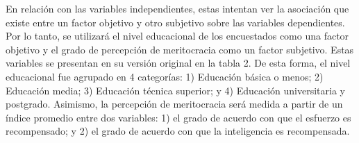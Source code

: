 \documentclass[
]{article}
\begin{document}
En relación con las variables independientes, estas intentan ver la
asociación que existe entre un factor objetivo y otro subjetivo sobre
las variables dependientes. Por lo tanto, se utilizará el nivel
educacional de los encuestados como una factor objetivo y el grado de
percepción de meritocracia como un factor subjetivo. Estas variables se
presentan en su versión original en la tabla 2. De esta forma, el nivel
educacional fue agrupado en 4 categorías: 1) Educación básica o menos;
2) Educación media; 3) Educación técnica superior; y 4) Educación
universitaria y postgrado. Asimismo, la percepción de meritocracia será
medida a partir de un índice promedio entre dos variables: 1) el grado
de acuerdo con que el esfuerzo es recompensado; y 2) el grado de acuerdo
con que la inteligencia es recompensada.

\begin{table}[!h]


\end{table}
\end{document}
